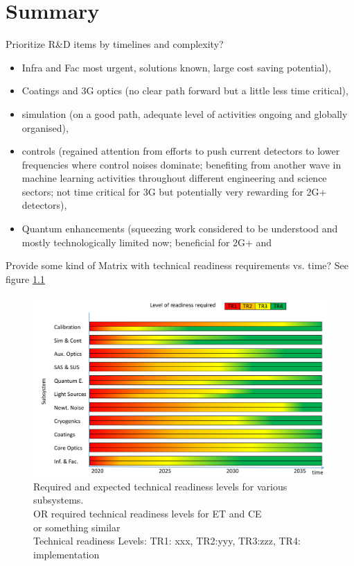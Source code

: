 \chapter{Summary}
\label{sec:Summary}


Prioritize R\&D items by timelines and complexity?
\begin{itemize}
\item Infra and Fac most urgent, solutions known, large cost saving potential), 
\item Coatings and 3G optics (no clear path forward but a little less time critical), 
\item simulation (on a good path, adequate level of activities ongoing and globally organised), 
\item controls (regained attention from efforts to push current detectors to lower frequencies where control noises dominate; benefiting from another wave in machine learning activities throughout different engineering and science sectors; not time critical for 3G but potentially very rewarding for 2G+ detectors), 
\item Quantum enhancements (squeezing work considered to be understood and mostly technologically limited now; beneficial for 2G+ and
\end{itemize}
Provide some kind of Matrix with technical readiness requirements vs. time?
See figure \ref{fig:maturity}
\begin{figure}[h]
\centering
\includegraphics*[width= \textwidth]{Figures/3G_Readiness_Levels.pdf}
\caption{Required and expected technical readiness levels for various subsystems.\\
OR required technical readiness levels for ET and CE\\
or something similar\\
Technical readiness Levels: TR1: xxx, TR2:yyy, TR3:zzz, TR4: implementation}
\label{fig:maturity}
\end{figure}

